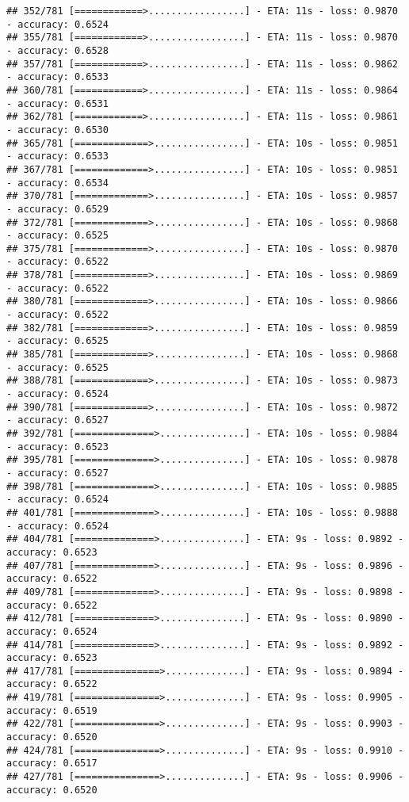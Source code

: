\documentclass[
]{article}
\begin{document}
\begin{verbatim}
## 352/781 [============>.................] - ETA: 11s - loss: 0.9870 - accuracy: 0.6524
## 355/781 [============>.................] - ETA: 11s - loss: 0.9870 - accuracy: 0.6528
## 357/781 [============>.................] - ETA: 11s - loss: 0.9862 - accuracy: 0.6533
## 360/781 [============>.................] - ETA: 11s - loss: 0.9864 - accuracy: 0.6531
## 362/781 [============>.................] - ETA: 11s - loss: 0.9861 - accuracy: 0.6530
## 365/781 [=============>................] - ETA: 10s - loss: 0.9851 - accuracy: 0.6533
## 367/781 [=============>................] - ETA: 10s - loss: 0.9851 - accuracy: 0.6534
## 370/781 [=============>................] - ETA: 10s - loss: 0.9857 - accuracy: 0.6529
## 372/781 [=============>................] - ETA: 10s - loss: 0.9868 - accuracy: 0.6525
## 375/781 [=============>................] - ETA: 10s - loss: 0.9870 - accuracy: 0.6522
## 378/781 [=============>................] - ETA: 10s - loss: 0.9869 - accuracy: 0.6522
## 380/781 [=============>................] - ETA: 10s - loss: 0.9866 - accuracy: 0.6522
## 382/781 [=============>................] - ETA: 10s - loss: 0.9859 - accuracy: 0.6525
## 385/781 [=============>................] - ETA: 10s - loss: 0.9868 - accuracy: 0.6525
## 388/781 [=============>................] - ETA: 10s - loss: 0.9873 - accuracy: 0.6524
## 390/781 [=============>................] - ETA: 10s - loss: 0.9872 - accuracy: 0.6527
## 392/781 [==============>...............] - ETA: 10s - loss: 0.9884 - accuracy: 0.6523
## 395/781 [==============>...............] - ETA: 10s - loss: 0.9878 - accuracy: 0.6527
## 398/781 [==============>...............] - ETA: 10s - loss: 0.9885 - accuracy: 0.6524
## 401/781 [==============>...............] - ETA: 10s - loss: 0.9888 - accuracy: 0.6524
## 404/781 [==============>...............] - ETA: 9s - loss: 0.9892 - accuracy: 0.6523 
## 407/781 [==============>...............] - ETA: 9s - loss: 0.9896 - accuracy: 0.6522
## 409/781 [==============>...............] - ETA: 9s - loss: 0.9898 - accuracy: 0.6522
## 412/781 [==============>...............] - ETA: 9s - loss: 0.9890 - accuracy: 0.6524
## 414/781 [==============>...............] - ETA: 9s - loss: 0.9892 - accuracy: 0.6523
## 417/781 [===============>..............] - ETA: 9s - loss: 0.9894 - accuracy: 0.6522
## 419/781 [===============>..............] - ETA: 9s - loss: 0.9905 - accuracy: 0.6519
## 422/781 [===============>..............] - ETA: 9s - loss: 0.9903 - accuracy: 0.6520
## 424/781 [===============>..............] - ETA: 9s - loss: 0.9910 - accuracy: 0.6517
## 427/781 [===============>..............] - ETA: 9s - loss: 0.9906 - accuracy: 0.6520

\end{verbatim}
\end{document}
